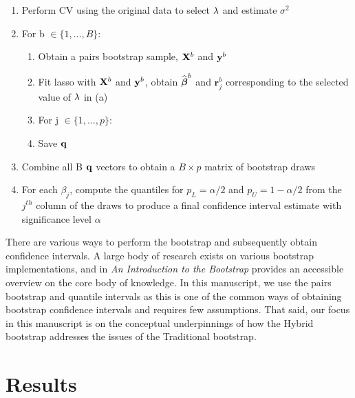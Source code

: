 \begin{enumerate}
\item Perform CV using the original data to select $\lambda$ and estimate $\sigma^2$
\item For b $\in \lbrace 1, \ldots, B \rbrace$:
\begin{enumerate}
\item Obtain a pairs bootstrap sample, $\mathbf{X}^b$ and $\mathbf{y}^b$
\item Fit lasso with $\mathbf{X}^b$ and $\mathbf{y}^b$, obtain $\widehat{\boldsymbol{\beta}}^b$ and $\boldsymbol{r}_j^b$ corresponding to the selected value of $\lambda$ in (a)
\item For j $\in \lbrace 1, \ldots, p \rbrace$:
	\begin{algorithmic}
    \EndCase
    \EndCase
	\EndSwitch
	\end{algorithmic}
\item Save $\mathbf{q}$
\end{enumerate}
\item Combine all B $\mathbf{q}$ vectors to obtain a $B \times p$ matrix of bootstrap draws
\item For each $\beta_j$, compute the quantiles for $p_L = \alpha/2$ and $p_U = 1 - \alpha/2$ from the $j^{th}$ column of the draws to produce a final confidence interval estimate with significance level $\alpha$
\end{enumerate}

There are various ways to perform the bootstrap and subsequently obtain confidence intervals. A large body of research exists on various bootstrap implementations, and \cite{Efron1994} in \textit{An Introduction to the Bootstrap} provides an accessible overview on the core body of knowledge. In this manuscript, we use the pairs bootstrap and quantile intervals as this is one of the common ways of obtaining bootstrap confidence intervals and requires few assumptions. That said, our focus in this manuscript is on the conceptual underpinnings of how the Hybrid bootstrap addresses the issues of the Traditional bootstrap.

\section{Results}
\label{Sec:results}

